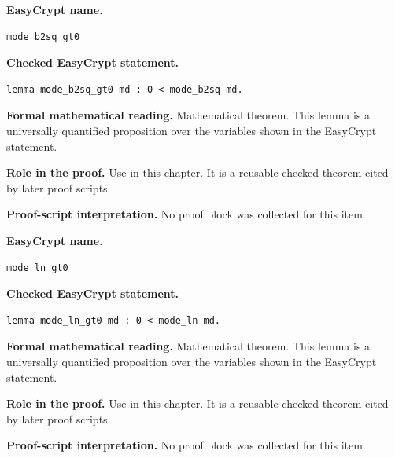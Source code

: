 \begin{formaltheorem}
\noindent\textbf{EasyCrypt name.}
\begin{lstlisting}[language=EasyCrypt,basicstyle=\ttfamily\scriptsize]
mode_b2sq_gt0
\end{lstlisting}
\noindent\textbf{Checked EasyCrypt statement.}
\begin{lstlisting}[language=EasyCrypt,basicstyle=\ttfamily\scriptsize]
lemma mode_b2sq_gt0 md : 0 < mode_b2sq md.
\end{lstlisting}
\noindent\textbf{Formal mathematical reading.}
Mathematical theorem. This lemma is a universally quantified proposition over the variables shown in the EasyCrypt statement.

\noindent\textbf{Role in the proof.}
Use in this chapter. It is a reusable checked theorem cited by later proof scripts.

\noindent\textbf{Proof-script interpretation.}
No proof block was collected for this item.

\end{formaltheorem}

\begin{formaltheorem}
\noindent\textbf{EasyCrypt name.}
\begin{lstlisting}[language=EasyCrypt,basicstyle=\ttfamily\scriptsize]
mode_ln_gt0
\end{lstlisting}
\noindent\textbf{Checked EasyCrypt statement.}
\begin{lstlisting}[language=EasyCrypt,basicstyle=\ttfamily\scriptsize]
lemma mode_ln_gt0 md : 0 < mode_ln md.
\end{lstlisting}
\noindent\textbf{Formal mathematical reading.}
Mathematical theorem. This lemma is a universally quantified proposition over the variables shown in the EasyCrypt statement.

\noindent\textbf{Role in the proof.}
Use in this chapter. It is a reusable checked theorem cited by later proof scripts.

\noindent\textbf{Proof-script interpretation.}
No proof block was collected for this item.

\end{formaltheorem}

